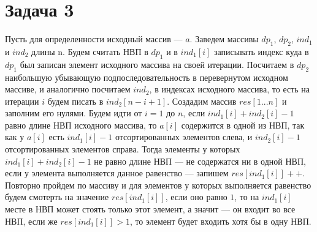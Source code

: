 \documentclass{article}
\begin{document}
\section{Задача 3}
Пусть для определенности исходный массив --- $a$. Заведем массивы $dp_1$, $dp_2$, $ind_1$ и $ind_2$ длины n. Будем считать НВП в $dp_1$ и в $ind_1[i]$ записывать индекс куда в $dp_1$ был записан элемент исходного массива на своей итерации. Посчитаем в $dp_2$ наибольшую убывающую подпоследовательность в перевернутом исходном массиве, и аналогично посчитаем $ind_2$, в индексах исходного массива, то есть на итерации $i$ будем писать в $ind_2[n-i+1]$. Создадим массив $res[1...n]$ и заполним его нулями. Будем идти от $i=1$ до $n$, если $ind_1[i] + ind_2[i] - 1$ равно длине НВП исходного массива, то $a[i]$ содержится в одной из НВП, так как у $a[i]$ есть $ind_1[i] - 1$ отсортированных элементов слева, и $ind_2[i] - 1$ отсортированных элементов справа. Тогда элементы у которых $ind_1[i] + ind_2[i] - 1$ не равно длине НВП --- не содержатся ни в одной НВП, если у элемента выполняется данное равенство --- запишем $res[ind_1[i]]++$. Повторно пройдем по массиву и для элементов у которых выполняется равенство будем смотерть на значение $res[ind_1[i]]$, если оно равно $1$, то на $ind_1[i]$ месте в НВП может стоять только этот элемент, а значит --- он входит во все НВП, если же $res[ind_1[i]]>1$, то элемент будет входить хотя бы в одну НВП. 
\end{document}
